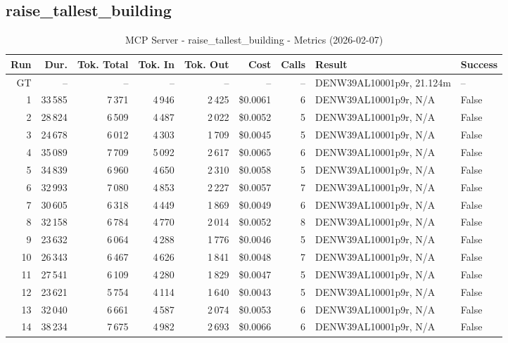 \documentclass[a4paper,11pt]{article}
\begin{document}
\clearpage
\subsection{raise\_tallest\_building}

\begin{table}[ht]
\centering
\scriptsize
\caption{MCP Server - raise\_tallest\_building - Metrics (2026-02-07)}
\label{tab:mcp\_raise\_tallest\_building\_metrics\_2026-02-07}
\begin{tabular}{r r r r r r r p{3cm} l}
\hline
Run & Dur. & Tok. Total & Tok. In & Tok. Out & Cost & Calls & Result & Success \\
\hline
GT & -- & -- & -- & -- & -- & -- & DENW39AL10001p9r, 21.124m & -- \\
1 & 33\,585 & 7\,371 & 4\,946 & 2\,425 & \$0.0061 & 6 & DENW39AL10001p9r, N/A & False \\
2 & 28\,824 & 6\,509 & 4\,487 & 2\,022 & \$0.0052 & 5 & DENW39AL10001p9r, N/A & False \\
3 & 24\,678 & 6\,012 & 4\,303 & 1\,709 & \$0.0045 & 5 & DENW39AL10001p9r, N/A & False \\
4 & 35\,089 & 7\,709 & 5\,092 & 2\,617 & \$0.0065 & 6 & DENW39AL10001p9r, N/A & False \\
5 & 34\,839 & 6\,960 & 4\,650 & 2\,310 & \$0.0058 & 5 & DENW39AL10001p9r, N/A & False \\
6 & 32\,993 & 7\,080 & 4\,853 & 2\,227 & \$0.0057 & 7 & DENW39AL10001p9r, N/A & False \\
7 & 30\,605 & 6\,318 & 4\,449 & 1\,869 & \$0.0049 & 6 & DENW39AL10001p9r, N/A & False \\
8 & 32\,158 & 6\,784 & 4\,770 & 2\,014 & \$0.0052 & 8 & DENW39AL10001p9r, N/A & False \\
9 & 23\,632 & 6\,064 & 4\,288 & 1\,776 & \$0.0046 & 5 & DENW39AL10001p9r, N/A & False \\
10 & 26\,343 & 6\,467 & 4\,626 & 1\,841 & \$0.0048 & 7 & DENW39AL10001p9r, N/A & False \\
11 & 27\,541 & 6\,109 & 4\,280 & 1\,829 & \$0.0047 & 5 & DENW39AL10001p9r, N/A & False \\
12 & 23\,621 & 5\,754 & 4\,114 & 1\,640 & \$0.0043 & 5 & DENW39AL10001p9r, N/A & False \\
13 & 32\,040 & 6\,661 & 4\,587 & 2\,074 & \$0.0053 & 6 & DENW39AL10001p9r, N/A & False \\
14 & 38\,234 & 7\,675 & 4\,982 & 2\,693 & \$0.0066 & 6 & DENW39AL10001p9r, N/A & False \\

\end{tabular}
\end{table}
\end{document}
